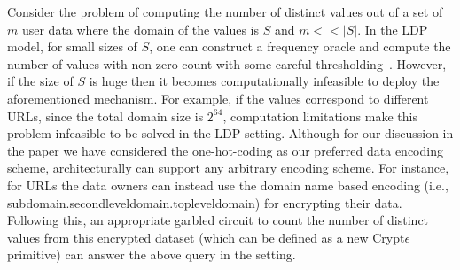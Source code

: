 Consider the problem of computing the number of distinct values out of a set of $m$ user data where the domain of the values is $S$ and $m<<|S|$. In the \textsf{LDP} model, for small sizes of $S$, one can construct a frequency oracle and compute the number of values with non-zero count with some careful thresholding~\cite{LDP1}. However, if the size of $S$ is huge then it becomes computationally infeasible to deploy the aforementioned mechanism. For example, if the values correspond to different URLs, since the total domain size is $2^{64}$, computation limitations make this problem infeasible to be solved in the \textsf{LDP} setting.  Although for our discussion in the paper we have considered the one-hot-coding as our preferred data encoding scheme, \system architecturally can support any arbitrary encoding scheme.  For instance, for URLs the data owners can instead use the domain name based encoding (i.e., subdomain.secondleveldomain.topleveldomain) for encrypting their data. Following this, an appropriate garbled circuit to count the number of distinct values from this encrypted dataset (which can be defined as a new Crypt$\epsilon$ primitive) can answer the above query in the \system setting.

\begin{comment}\subsection{Answering queries with disjunctions in predicate} Now let us consider a DNF query predicate $\phi=\phi_1 \vee \phi_2$ where $\phi_1=(A_1==v_1 \wedge \ldots \wedge A_n==v_n)$ and $\phi_2=(A'_1==v'_1 \wedge \ldots \wedge A'_n==v'_n)$ are two conjunctive clauses. For a given record assume, \begin{gather*}\mathbf{d}=\mathbf{c_1}\oplus \mathbf{c_2}-labMult(\mathbf{c_1,c_2}) \\
\mathbf{c_1}=genLabMult(\mathbf{\tilde{R}}_{A1}[v_1], \ldots ,\mathbf{\tilde{R}}_{An}[v_n] ) \\ \mathbf{c_1}=genLabMult(\mathbf{\tilde{R}}_{A1}[v_1], \ldots ,\mathbf{\tilde{R}}_{An}[v_n] )\end{gather*} Note that $d=1$  only iff  the record satisfies $\phi$. Thus for a two clause  DNF predicate as above, the optimized Filter transformation takes as input $x \times y$ encrypted table $\tilde{\mathbf{T}}$ with attribute set $\bigcup_{i=1}^n Attribute(\phi_i)$ and outputs a $x \times 1$ encrypted table $\mathbf{\tilde{T}}'$ such that \begin{gather} \mathbf{\tilde{T}}'[i]= \mathbf{c_1}\oplus \mathbf{c_2}-labMult(\mathbf{c_1,c_2}) \\
\mathbf{c_1}=genLabMult(\mathbf{\tilde{R}}_{A1}[v_1], \ldots ,\mathbf{\tilde{R}}_{An}[v_n] ) \\ \mathbf{c_1}=genLabMult(\mathbf{\tilde{R}}_{A1}[v_1], \ldots ,\mathbf{\tilde{R}}_{An}[v_n] )\end{gather} For $t>2$ clauses in a DNF, apply the Filter transformation pairwise for $\lceil \log t \rceil$ iterations. 
\end{comment}

